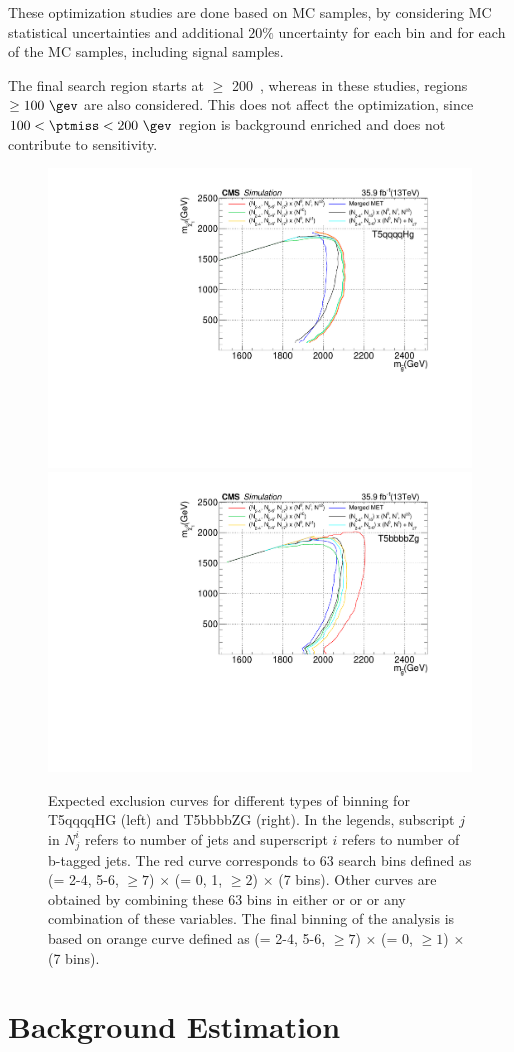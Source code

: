 These optimization studies are done based on MC samples, by considering MC statistical uncertainties and additional $20\%$ uncertainty for each bin and for each of the MC samples, including signal samples.

The final search region starts at \ptmiss $\geq$ 200~\gev, whereas in these studies, regions $\geq 100~\gev$ are also considered. This does not affect the optimization, since $100 < \ptmiss < 200~\gev$ region is background enriched and does not contribute to sensitivity.

\begin{figure}[h!]
\centering
\includegraphics[width=0.48\linewidth]{../Figures/Chap3/optimization/T5qqqqHg_Optimization.pdf}
\includegraphics[width=0.48\linewidth]{../Figures/Chap3/optimization/T5bbbbZg_Optimization.pdf}
\captionsetup{width=.9\linewidth}
\caption{Expected exclusion curves for different types of binning for T5qqqqHG (left) and T5bbbbZG (right). In the legends, subscript $j$ in $N^i_j$ refers to number of jets and superscript $i$ refers to number of b-tagged jets. The red curve corresponds to 63 search bins defined as (\nj = 2-4, 5-6, $\geq 7$) $\times$ (\nb = 0, 1, $\geq2$) $\times$ (7 \ptmiss bins). Other curves are obtained by combining these 63 bins in either \nj or \nb or \ptmiss or any combination of these variables. The final binning of the analysis is based on  orange curve defined as (\nj = 2-4, 5-6, $\geq 7$) $\times$ (\nb = 0, $\geq1$) $\times$ (7 \ptmiss bins).}
\label{fig:optCurves}
\end{figure}

\section{Background Estimation}
\label{sec:bkgestimation}

